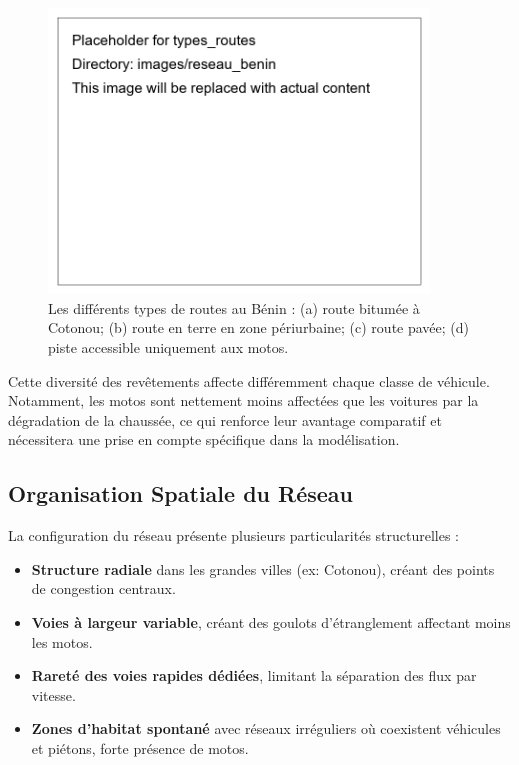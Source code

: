 \begin{figure}[htbp]
    \centering
    \includegraphics[width=0.9\textwidth]{images/reseau_benin/types_routes} %
    \caption{Les différents types de routes au Bénin : (a) route bitumée à Cotonou; (b) route en terre en zone périurbaine; (c) route pavée; (d) piste accessible uniquement aux motos.}
    \label{fig:types_routes} %
\end{figure}

\begin{remark}
Cette diversité des revêtements affecte différemment chaque classe de véhicule. Notamment, les motos sont nettement moins affectées que les voitures par la dégradation de la chaussée, ce qui renforce leur avantage comparatif et nécessitera une prise en compte spécifique dans la modélisation.
\end{remark}

\subsection{Organisation Spatiale du Réseau}
\label{subsec:organisation_spatiale} %

La configuration du réseau présente plusieurs particularités structurelles :
\begin{itemize}
    \item \textbf{Structure radiale} dans les grandes villes (ex: Cotonou), créant des points de congestion centraux.
    \item \textbf{Voies à largeur variable}, créant des goulots d'étranglement affectant moins les motos.
    \item \textbf{Rareté des voies rapides dédiées}, limitant la séparation des flux par vitesse.
    \item \textbf{Zones d'habitat spontané} avec réseaux irréguliers où coexistent véhicules et piétons, forte présence de motos.
\end{itemize}

